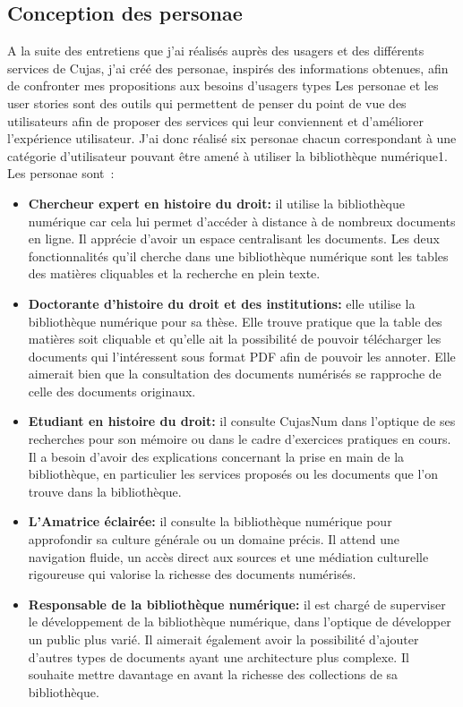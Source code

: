 \subsection{Conception des personae}
A la suite des entretiens que j’ai réalisés auprès des usagers et des différents services de Cujas, j’ai créé des personae, inspirés des informations obtenues, afin de confronter mes propositions aux besoins d’usagers types Les personae et les user stories sont des outils qui permettent de penser du point de vue des utilisateurs afin de proposer des services qui leur conviennent et d’améliorer l’expérience utilisateur.
J’ai donc réalisé six personae chacun correspondant à une catégorie d’utilisateur pouvant être amené à utiliser la bibliothèque numérique1. Les personae sont :
\begin{itemize}
	\item \textbf{Chercheur expert en histoire du droit:} il utilise la bibliothèque numérique car cela lui permet d’accéder à distance à de nombreux documents en ligne. Il apprécie d’avoir un espace centralisant les documents. Les deux fonctionnalités qu’il cherche dans une bibliothèque numérique sont les tables des matières cliquables et la recherche en plein texte. 
\item \textbf{Doctorante d’histoire du droit et des institutions:} elle utilise la bibliothèque numérique pour sa thèse. Elle trouve pratique que la table des matières soit cliquable et qu’elle ait la possibilité de pouvoir télécharger les documents qui l’intéressent sous format PDF afin de pouvoir les annoter. Elle aimerait bien que la consultation des documents numérisés se rapproche de celle des documents originaux. 
\item \textbf{Etudiant en histoire du droit:} il consulte CujasNum dans l’optique de ses recherches pour son mémoire ou dans le cadre d’exercices pratiques en cours. Il a besoin d’avoir des explications concernant la prise en main de la bibliothèque, en particulier les services proposés ou les documents que l’on trouve dans la bibliothèque.
\item \textbf{L’Amatrice éclairée:} il consulte la bibliothèque numérique pour approfondir sa culture générale ou un domaine précis. Il attend une navigation fluide, un accès direct aux sources et une médiation culturelle rigoureuse qui valorise la richesse des documents numérisés.
\item \textbf{Responsable de la bibliothèque numérique:} il est chargé de superviser le développement de la bibliothèque numérique, dans l’optique de développer un public plus varié. Il aimerait également avoir la possibilité d’ajouter d’autres types de documents ayant une architecture plus complexe. Il souhaite mettre davantage en avant la richesse des collections de sa bibliothèque. 

\end{itemize}
